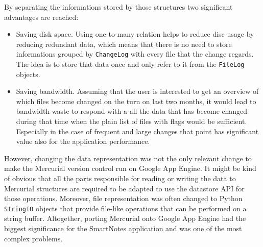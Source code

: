 
By separating the informations stored by those structures two significant advantages are reached:
\begin{itemize}
\item{Saving disk space. Using one-to-many relation helps to reduce disc usage by reducing redundant data, which means that there is no need to store informations grouped by \texttt{ChangeLog} with every file that the change regards. The idea is to store that data once and only refer to it from the \texttt{FileLog} objects.}
\item{Saving bandwidth. Assuming that the user is interested to get an overview of which files become changed on the turn on last two months, it would lead to bandwidth waste to respond with a all the data that has become changed during that time when the plain list of files with flags would be sufficient. Especially in the case of frequent and large changes that point has significant value also for the application performance.}
\end{itemize}
 
However, changing the data representation was not the only relevant change to make the Mercurial version control run on Google App Engine. It might be kind of obvious that all the parts responsible for reading or writing the data to Mercurial structures are required to be adapted to use the datastore API for those operations. Moreover, file representation was often changed to Python \texttt{StringIO} objects that provide file-like operations that can be performed on a string buffer. Altogether, porting Mercurial onto Google App Engine had the biggest significance for the SmartNotes application and was one of the most complex problems.      
 
 
